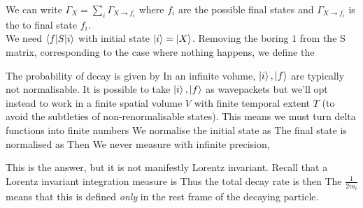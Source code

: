 \documentclass{article}
\begin{document}
We can write $\Gamma_X = \sum_i \Gamma_{X \to f_i}$ where $f_i$ are the possible final states and $\Gamma_{X \to f_i}$ is the  to final state $f_i$. \\

We need $\braket{f | S | i}$ with initial state $\ket{i} = \ket{X}$. Removing the boring $1$ from the S matrix, corresponding to the case where nothing happens, we define the  

The probability of decay is given by 
In an infinite volume, $\ket{i},\ket{f}$ are typically not normalisable. It is possible to take $\ket{i},\ket{f}$ as wavepackets but we'll opt instead to work in a finite spatial volume $V$ with finite temporal extent $T$ (to avoid the subtleties of non-renormalisable states). This means we must turn delta functions into finite numbers 
We normalise the initial state as 
The final state is normalised as 
Then 
We never measure with infinite precision, 

This is the answer, but it is not manifestly Lorentz invariant. Recall that a Lorentz invariant integration measure is 
Thus 
the total decay rate is then 
The $\frac{1}{2m_i}$ means that this is defined \emph{only} in the rest frame of the decaying particle. 

\end{document}
